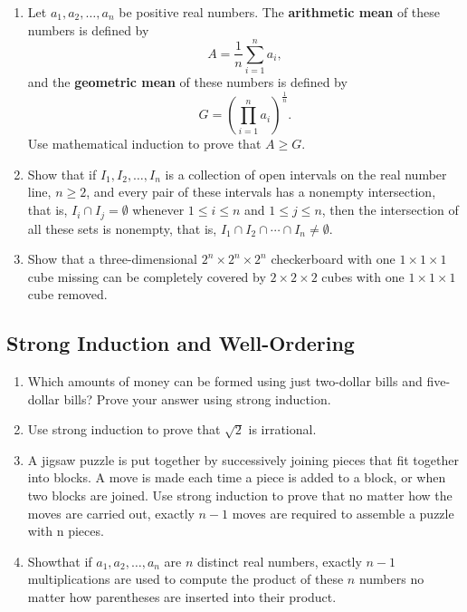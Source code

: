 \documentclass{../../cls/sig-alternate-05-2015}
\begin{document}
\begin{enumerate}
\item Let $a_1, a_2, \ldots, a_n$ be positive real numbers.
The \textbf{arithmetic mean} of these numbers is defined by \begin{equation}
    A = \frac{1}{n} \sum_{i = 1}^n a_i,
\end{equation} and the \textbf{geometric mean} of these numbers is defined by \begin{equation}
    G = \left(\prod_{i = 1}^{n} a_i\right)^\frac{1}{n}.
\end{equation}
Use mathematical induction to prove that $A \ge G$.

\item Show that if $I_1, I_2, \ldots, I_n$ is a collection of open intervals on the real number line,
$n \ge 2$,
and every pair of these intervals has a nonempty intersection,
that is,
$I_i \cap I_j = \emptyset$ whenever $1 \le i \le n$ and $1 \le j \le n$,
then the intersection of all these sets is nonempty, that is,
$I_1 \cap I_2 \cap \cdots \cap I_n \ne \emptyset$.

\item Show that a three-dimensional $2^n \times 2^n \times 2^n$ checkerboard with one $1 \times 1 \times 1$ cube missing can be completely covered by $2 \times 2 \times 2$ cubes with one $1 \times 1 \times 1$ cube removed.

\end{enumerate}

\subsection{Strong Induction and Well-Ordering}
\begin{enumerate}
\item Which amounts of money can be formed using just two-dollar bills and five-dollar bills? Prove your answer using strong induction.
	
\item Use strong induction to prove that $\sqrt{2}$ is irrational.

\item A jigsaw puzzle is put together by successively joining
pieces that fit together into blocks. A move is made each
time a piece is added to a block, or when two blocks
are joined. Use strong induction to prove that no matter
how the moves are carried out, exactly $n - 1$ moves are
required to assemble a puzzle with n pieces.

\item Showthat if $a_1, a_2, \ldots, a_n$ are $n$ distinct real numbers, exactly $n - 1$ multiplications are used to compute the product of these $n$ numbers no matter how parentheses are inserted into their product.

\end{enumerate}
\end{document}
